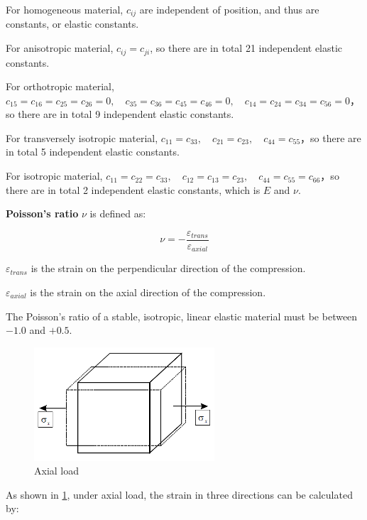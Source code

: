 \documentclass[en,hazy,cyan,8pt,normal]{elegantnote}
\numberwithin{equation}{section}
\begin{document}
    For homogeneous material, $c_{ij}$ are independent of position, and thus are constants, or elastic constants.

    For anisotropic material, $c_{ij}=c_{ji}$, so there are in total 21 independent elastic constants.

    For orthotropic material, $c_{15} = c_{16} = c_{25} = c_{26} = 0, \quad c_{35} = c_{36} = c_{45} = c_{46} = 0, \quad c_{14} = c_{24} = c_{34} = c_{56} = 0$，so there are in total 9 independent elastic constants.

    For transversely isotropic material, $c_{11}=c_{33}, \quad c_{21}=c_{23}, \quad c_{44}=c_{55}$，so there are in total 5 independent elastic constants.

    For isotropic material, $c_{11} = c_{22} = c_{33}, \quad c_{12} = c_{13} = c_{23}, \quad c_{44} = c_{55} = c_{66}$，so there are in total 2 independent elastic constants, which is $E$ and $\nu$.

    \textbf{Poisson's ratio} $\nu$ is defined as:

    \begin{equation}\label{eq:056}
      \nu = -\frac{\varepsilon_{trans}}{\varepsilon_{axial}}
    \end{equation}

    $\varepsilon_{trans}$ is the strain on the perpendicular direction of the compression. 

    $\varepsilon_{axial}$ is the strain on the axial direction of the compression.

    The Poisson's ratio of a stable, isotropic, linear elastic material must be between $-1.0$ and $+0.5$.

    \begin{figure}[H]
      \centering
      \includegraphics[width=0.6\textwidth]{image/015.png}
      \caption{Axial load}
      \label{fig:015}
    \end{figure}

    As shown in \cref{fig:015}, under axial load, the strain in three directions can be calculated by:
\end{document}
